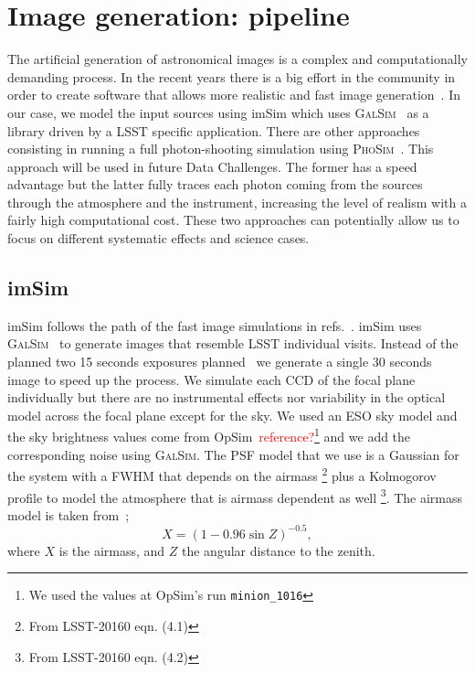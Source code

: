 \documentclass[\docopts]{\docclass}
\begin{document}
\section{Image generation: pipeline}
\label{sec:image_generation_pipeline}

The artificial generation of astronomical images is a complex and computationally demanding process. In the recent
years there is a big effort in the community in order to create software that allows more realistic and fast image
generation~\citep{2016MNRAS.457..786S,2016ApJ...817...25B}. In our case, we model the input sources using imSim which uses \textsc{GalSim}~\citep{2015A&C....10..121R} as a library driven
by a LSST specific application. There are other approaches consisting in
running a full photon-shooting simulation using \textsc{PhoSim}~\citep{2015ApJS..218...14P}. This approach will be used in future Data Challenges. The former has a speed
advantage but the latter fully traces each photon coming from the sources through the atmosphere and the instrument,
increasing the level of realism with a fairly high computational cost. These two approaches can potentially allow us to focus on different systematic effects and science cases.

\subsection{imSim}
\label{sec:imsim_pipeline}

imSim follows the path of the fast image simulations in refs.~\citep{2016MNRAS.457..786S,2016ApJ...817...25B}.
imSim uses \textsc{GalSim}~\citep{2015A&C....10..121R} to generate images that resemble LSST individual visits. Instead of the
planned two 15 seconds exposures planned~\citep{2008arXiv0805.2366I} we generate a single 30 seconds image to speed up the process.
We simulate each CCD of the focal plane individually but there are no instrumental effects nor variability in the optical model
across the focal plane except for the sky. We used an ESO sky model and the sky brightness values come from
OpSim~\textcolor{red}{reference?}\footnote{We used the values at OpSim's run \texttt{minion\_1016}} and we add the corresponding
noise using \textsc{GalSim}. The PSF model that we use is a Gaussian for the system with a FWHM that depends on the airmass
\footnote{From LSST-20160 eqn. (4.1)} plus a Kolmogorov profile to model the atmosphere that is airmass dependent as well
\footnote{From LSST-20160 eqn. (4.2)}. The airmass model is taken from~\citep{1991PASP..103.1033K};
\begin{equation}
X = (1 - 0.96\sin{Z})^{-0.5},
\end{equation}
where $X$ is the airmass, and $Z$ the angular distance to the zenith.
\end{document}
